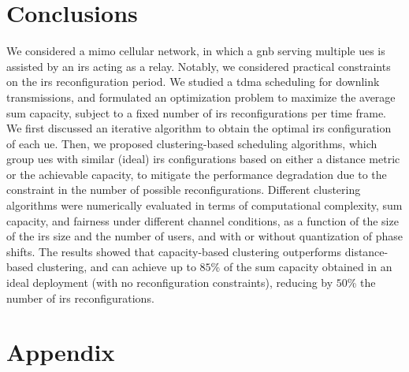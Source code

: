 \section{Conclusions}\label{sec:conclusions}
We considered a \gls{mimo} cellular network, in which a \gls{gnb} serving multiple \glspl{ue} is assisted by an \gls{irs} acting as a relay. 
Notably, we considered practical constraints on the \gls{irs} reconfiguration period. We studied a \gls{tdma} scheduling for downlink transmissions, and formulated an optimization problem to maximize the average sum capacity, subject to a fixed number of \gls{irs} reconfigurations per time frame. We first discussed an iterative algorithm to obtain the optimal \gls{irs} configuration of each \gls{ue}. 
Then, we proposed clustering-based scheduling algorithms, which group \glspl{ue} with similar (ideal) \gls{irs} configurations based on either a distance metric or the achievable capacity, to mitigate the performance degradation due to the constraint in the number of possible reconfigurations.
Different clustering algorithms were numerically evaluated in terms of computational complexity, sum capacity, and fairness under different channel conditions, as a function of the size of the \gls{irs} size and the number of users, and with or without quantization of phase shifts.
The results showed that capacity-based clustering outperforms distance-based clustering, and can achieve up to $85$\% of the sum capacity obtained in an ideal deployment (with no reconfiguration constraints), reducing by $50$\% the number of \gls{irs} reconfigurations.

\section*{Appendix}
